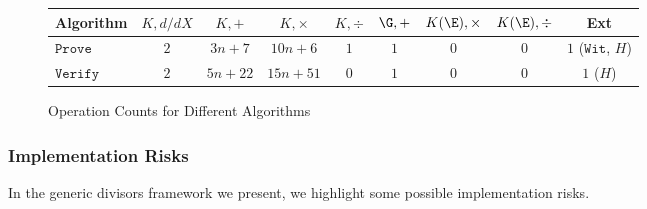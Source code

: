 \documentclass[11pt,letterpaper]{article}
\theoremstyle{definition}
\newcommand{\6}{\mathbf}
\newcommand{\7}{\mathcal}
\begin{document}

\begin{figure}[h!]
\centering
\begin{tabular}{|l||c|c|c|c|c|c|c|c|} \hline
Algorithm & $K, d/dX$ & $K,+$ & $K,\times$ & $K,\div$ & $\G,+$ & $K(\E), \times$ & $K(\E),\div$ & Ext \\ 
\hline \hline
$\texttt{Prove}$ & $2$ & $3n+7$ & $10n+6$ & $1$ &  $1$ & $0$  & $0$ & $1$ ($\texttt{Wit}$, $H$)\\ \hline
$\texttt{Verify}$ & $2$ & $5n+22$ & $15n+51$ & $0$ & $1$ & $0$ & $0$ & $1$ ($H$) \\ \hline
\end{tabular}
\caption{Operation Counts for Different Algorithms}
\label{tab:operation-counts}
\end{figure}


\subsubsection{Implementation Risks}


In the generic divisors framework we present, we highlight some possible implementation risks.
\end{document}
